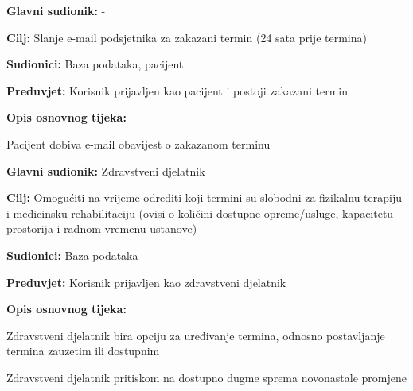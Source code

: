 \noindent {}
\begin{packed_item}
	
	\item \textbf{Glavni sudionik: }-
	\item  \textbf{Cilj:} Slanje e-mail podsjetnika za zakazani termin (24 sata prije termina)
	\item  \textbf{Sudionici:} Baza podataka, pacijent
	\item  \textbf{Preduvjet:} Korisnik prijavljen kao pacijent i postoji zakazani termin
	\item  \textbf{Opis osnovnog tijeka:}
	
	\item[] \begin{packed_enum}
		
		\item Pacijent dobiva e-mail obavijest o zakazanom terminu
	\end{packed_enum}
\end{packed_item}

\noindent {}
\begin{packed_item}
	
	\item \textbf{Glavni sudionik: }Zdravstveni djelatnik
	\item  \textbf{Cilj:} Omogućiti na vrijeme odrediti koji termini su slobodni za fizikalnu terapiju i medicinsku rehabilitaciju (ovisi o količini dostupne opreme/usluge, kapacitetu prostorija i radnom vremenu ustanove)
	\item  \textbf{Sudionici:} Baza podataka
	\item  \textbf{Preduvjet:} Korisnik prijavljen kao zdravstveni djelatnik
	\item  \textbf{Opis osnovnog tijeka:}
	
	\item[] \begin{packed_enum}
		
		\item Zdravstveni djelatnik bira opciju za uređivanje termina, odnosno postavljanje termina zauzetim ili dostupnim
		\item Zdravstveni djelatnik pritiskom na dostupno dugme sprema novonastale promjene
	\end{packed_enum}
\end{packed_item}

